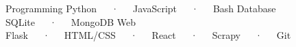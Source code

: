 

\begin{cvtechnicals}
  \cvtechnical %
    {Programming} %
    {Python~~~·~~~JavaScript~~~·~~~Bash} %
    {Database} %
    {SQLite~~~·~~~MongoDB} %
    {Web} %
    {Flask~~~·~~~HTML/CSS~~~·~~~React~~~·~~~Scrapy~~~·~~~Git} %
\end{cvtechnicals}